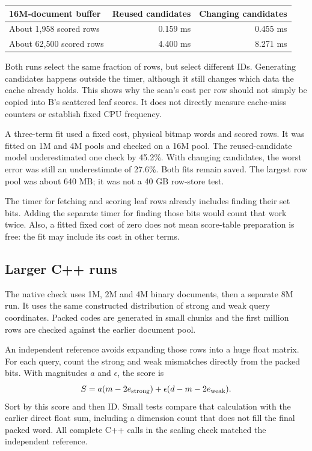 \begin{center}\small
\begin{tabular}{@{}lrr@{}}\toprule
16M-document buffer & Reused candidates & Changing candidates\\\midrule
About 1,958 scored rows & 0.159 ms & 0.455 ms\\
About 62,500 scored rows & 4.400 ms & 8.271 ms\\\bottomrule
\end{tabular}\normalsize\end{center}
Both runs select the same fraction of rows, but select different IDs. Generating candidates
happens outside the timer, although it still changes which data the cache already holds. This shows why the scan's cost per row should
not simply be copied into B's scattered leaf scores. It does not directly measure cache-miss
counters or establish fixed CPU frequency.

A three-term fit used a fixed cost, physical bitmap words and scored rows. It was fitted on
1M and 4M pools and checked on a 16M pool. The reused-candidate model underestimated one check
by 45.2\%. With changing candidates, the worst error was still an underestimate of 27.6\%.
Both fits remain saved. The largest row pool was about 640 MB; it was not a 40 GB row-store test.

The timer for fetching and scoring leaf rows already includes finding their set bits.
Adding the separate timer for finding those bits would count that work twice. Also, a fitted
fixed cost of zero does not mean score-table preparation is free: the fit may include its
cost in other terms.

\subsection{Larger C++ runs}
The native check uses 1M, 2M and 4M binary documents, then a separate 8M run. It uses the same
constructed distribution of strong and weak query coordinates. Packed codes are generated in small chunks and
the first million rows are checked against the earlier document pool.

An independent reference avoids expanding those rows into a huge float matrix. For each query,
count the strong and weak mismatches directly from the packed bits. With magnitudes $a$ and
$\epsilon$, the score is
\[
S=a(m-2e_{\rm strong})+\epsilon(d-m-2e_{\rm weak}).
\]
Sort by this score and then ID. Small tests compare that calculation with the earlier direct
float sum, including a dimension count that does not fill the final packed word. All complete
C++ calls in the scaling check matched the independent reference.

